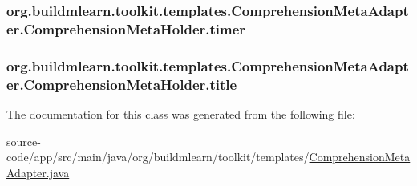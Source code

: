 \subsubsection[{\texorpdfstring{timer}{timer}}]{ org.\+buildmlearn.\+toolkit.\+templates.\+Comprehension\+Meta\+Adapter.\+Comprehension\+Meta\+Holder.\+timer}\hypertarget{classorg_1_1buildmlearn_1_1toolkit_1_1templates_1_1ComprehensionMetaAdapter_1_1ComprehensionMetaHolder_a8aa98aa62ddcb7c7da064ba29b7fc7ec}{}\label{classorg_1_1buildmlearn_1_1toolkit_1_1templates_1_1ComprehensionMetaAdapter_1_1ComprehensionMetaHolder_a8aa98aa62ddcb7c7da064ba29b7fc7ec}
\subsubsection[{\texorpdfstring{title}{title}}]{ org.\+buildmlearn.\+toolkit.\+templates.\+Comprehension\+Meta\+Adapter.\+Comprehension\+Meta\+Holder.\+title}\hypertarget{classorg_1_1buildmlearn_1_1toolkit_1_1templates_1_1ComprehensionMetaAdapter_1_1ComprehensionMetaHolder_a8402aa0e7e45bbc61431b2dc10cae0e8}{}\label{classorg_1_1buildmlearn_1_1toolkit_1_1templates_1_1ComprehensionMetaAdapter_1_1ComprehensionMetaHolder_a8402aa0e7e45bbc61431b2dc10cae0e8}


The documentation for this class was generated from the following file\+:\begin{DoxyCompactItemize}
\item 
source-\/code/app/src/main/java/org/buildmlearn/toolkit/templates/\hyperlink{ComprehensionMetaAdapter_8java}{Comprehension\+Meta\+Adapter.\+java}\end{DoxyCompactItemize}
